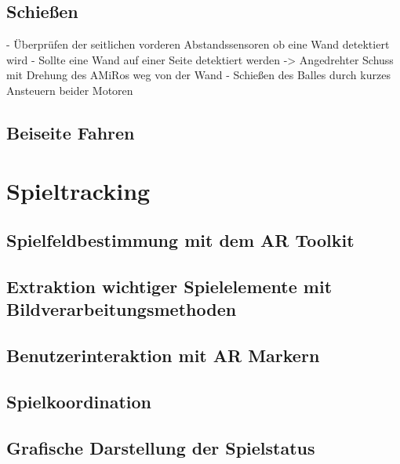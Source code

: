 \subsection{Schießen} %
- Überprüfen der seitlichen vorderen Abstandssensoren ob eine Wand detektiert wird
	- Sollte eine Wand auf einer Seite detektiert werden -> Angedrehter Schuss mit Drehung des AMiRos weg von der Wand
- Schießen des Balles durch kurzes Ansteuern beider Motoren 

\subsection{Beiseite Fahren} %

\section{Spieltracking} %

\subsection{Spielfeldbestimmung mit dem AR Toolkit} %

\subsection{Extraktion wichtiger Spielelemente mit Bildverarbeitungsmethoden} %

\subsection{Benutzerinteraktion mit AR Markern} %

\subsection{Spielkoordination} %

\subsection{Grafische Darstellung der Spielstatus} %